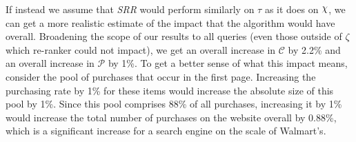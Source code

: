 \documentclass{article}
\def\Chi{\raisebox{2pt}{$\chi$}}
\begin{document}
If instead we assume that {\em SRR} would perform similarly on $\tau$
as it does on $\Chi$, we can get a more realistic estimate of the impact that the
algorithm would have overall. Broadening the scope of our results to all
queries (even those outside of $\zeta$ which re-ranker could not impact), 
we get an overall increase in $\mathscr{C}$ by 2.2\% and an overall increase in $\mathscr{P}$
by 1\%. To get a better sense of what
this impact means, consider the pool of purchases that occur in the
first page. Increasing the purchasing rate by 1\% for these items would
increase the absolute size of this pool by 1\%. Since this pool
comprises 88\% of all purchases, increasing it by 1\% would increase
the total number of purchases on the website overall by 0.88\%, which
is a significant increase for a search engine on the scale of Walmart’s.
\end{document}
